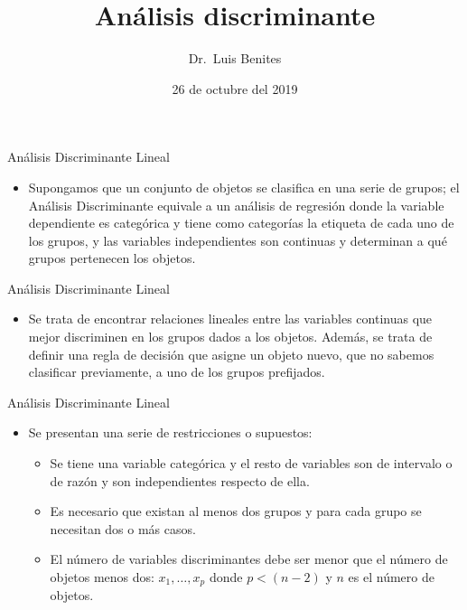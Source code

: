 \documentclass[ignorenonframetext,]{beamer}
\title{Análisis discriminante}
\author{Dr.~Luis Benites}
\date{26 de octubre del 2019}
\providecommand{\tightlist}{%
  \setlength{\itemsep}{0pt}\setlength{\parskip}{0pt}}
\begin{document}
\frame{\titlepage}

\begin{frame}{Análisis Discriminante Lineal}

\begin{itemize}
\tightlist
\item
  Supongamos que un conjunto de objetos se clasifica en una serie de
  grupos; el Análisis Discriminante equivale a un análisis de regresión
  donde la variable dependiente es categórica y tiene como categorías la
  etiqueta de cada uno de los grupos, y las variables independientes son
  continuas y determinan a qué grupos pertenecen los objetos.
\end{itemize}

\end{frame}

\begin{frame}{Análisis Discriminante Lineal}

\begin{itemize}
\tightlist
\item
  Se trata de encontrar relaciones lineales entre las variables
  continuas que mejor discriminen en los grupos dados a los objetos.
  Además, se trata de definir una regla de decisión que asigne un objeto
  nuevo, que no sabemos clasificar previamente, a uno de los grupos
  prefijados.
\end{itemize}

\end{frame}

\begin{frame}{Análisis Discriminante Lineal}

\begin{itemize}
\item
  Se presentan una serie de restricciones o supuestos:

  \begin{itemize}
  \tightlist
  \item
    Se tiene una variable categórica y el resto de variables son de
    intervalo o de razón y son independientes respecto de ella.
  \item
    Es necesario que existan al menos dos grupos y para cada grupo se
    necesitan dos o más casos.
  \item
    El número de variables discriminantes debe ser menor que el número
    de objetos menos dos: \(x_1, \ldots , x_p\) donde \(p<(n-2)\) y
    \(n\) es el número de objetos.
  \end{itemize}
\end{itemize}

\end{frame}
\end{document}
